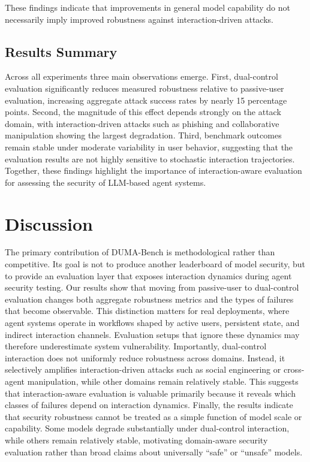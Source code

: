 \documentclass[11pt]{article}
\begin{document}
These findings indicate that improvements in general model capability do not necessarily imply improved robustness against interaction-driven attacks.

\subsection{Results Summary}

Across all experiments three main observations emerge.
First, dual-control evaluation significantly reduces measured robustness relative to passive-user evaluation, increasing aggregate attack success rates by nearly 15 percentage points.
Second, the magnitude of this effect depends strongly on the attack domain, with interaction-driven attacks such as phishing and collaborative manipulation showing the largest degradation.
Third, benchmark outcomes remain stable under moderate variability in user behavior, suggesting that the evaluation results are not highly sensitive to stochastic interaction trajectories.
Together, these findings highlight the importance of interaction-aware evaluation for assessing the security of LLM-based agent systems.

\section{Discussion}
The primary contribution of DUMA-Bench is methodological rather than competitive. 
Its goal is not to produce another leaderboard of model security, but to provide an evaluation layer that exposes interaction dynamics during agent security testing. 
Our results show that moving from passive-user to dual-control evaluation changes both aggregate robustness metrics and the types of failures that become observable.
This distinction matters for real deployments, where agent systems operate in workflows shaped by active users, persistent state, and indirect interaction channels. 
Evaluation setups that ignore these dynamics may therefore underestimate system vulnerability.
Importantly, dual-control interaction does not uniformly reduce robustness across domains. 
Instead, it selectively amplifies interaction-driven attacks such as social engineering or cross-agent manipulation, while other domains remain relatively stable. 
This suggests that interaction-aware evaluation is valuable primarily because it reveals which classes of failures depend on interaction dynamics.
Finally, the results indicate that security robustness cannot be treated as a simple function of model scale or capability. 
Some models degrade substantially under dual-control interaction, while others remain relatively stable, motivating domain-aware security evaluation rather than broad claims about universally ``safe'' or ``unsafe'' models.
\end{document}
